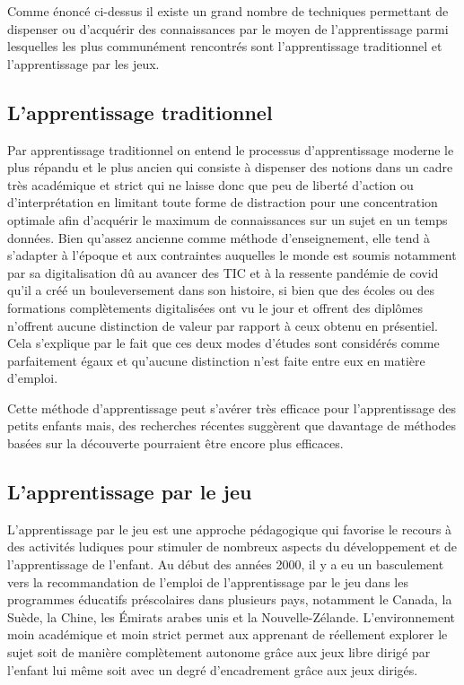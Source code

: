 Comme énoncé ci-dessus il existe un grand nombre de techniques permettant de dispenser ou d'acquérir des connaissances par le moyen de l'apprentissage parmi lesquelles les plus communément rencontrés sont l'apprentissage traditionnel et l'apprentissage par les jeux.

\subsection{L'apprentissage traditionnel}

Par apprentissage traditionnel on entend le processus d'apprentissage moderne le plus répandu et le plus ancien qui consiste à dispenser des notions dans un cadre très académique et strict qui ne laisse donc que peu de liberté d'action ou d'interprétation en limitant toute forme de distraction pour une concentration optimale afin
d'acquérir le maximum de connaissances sur un sujet en un temps données. Bien qu'assez ancienne comme méthode d'enseignement, elle tend à s'adapter à l'époque et aux contraintes auquelles le monde est soumis notamment par sa digitalisation dû au avancer des TIC et à la ressente pandémie de covid qu'il a créé un bouleversement dans son histoire, si bien que des écoles ou des formations
complètements digitalisées ont vu le jour et offrent des diplômes n'offrent aucune distinction de valeur par rapport à ceux obtenu en présentiel. Cela s'explique par le fait que ces deux modes d'études sont considérés comme parfaitement égaux et qu'aucune distinction n'est faite entre eux en matière d'emploi\cite{radovic2010advantages}.

Cette méthode d'apprentissage peut s'avérer très efficace pour l'apprentissage des petits enfants mais, des recherches récentes suggèrent que davantage de méthodes basées sur la découverte pourraient être encore plus efficaces.\cite{Weisberg2018GuidedPlay}

\subsection{L'apprentissage par le jeu}

L'apprentissage par le jeu est une approche pédagogique qui favorise le recours à des activités
ludiques pour stimuler de nombreux aspects du développement et de l'apprentissage de l'enfant\cite{AngelaPyle2018Apprentissage}.
Au début des années 2000, il y a eu un basculement vers la recommandation de l’emploi de
l’apprentissage par le jeu dans les programmes éducatifs préscolaires dans plusieurs pays,
notamment le Canada,\cite{whitebread2009play}
la Suède,\cite{Daubert2018Play}
la Chine,\cite{pyle2017continuum}
les Émirats arabes unis\cite{Hassinger2018Playing}
et la Nouvelle-Zélande\cite{Daubert2018Play}. L'environnement moin académique et moin strict permet aux apprenant de réellement explorer
le sujet soit de manière complètement autonome grâce aux jeux libre\cite{Berk2018Role} dirigé par l'enfant lui même soit avec un degré d'encadrement grâce aux jeux dirigés\cite{Bergen2018Cognitive}.

